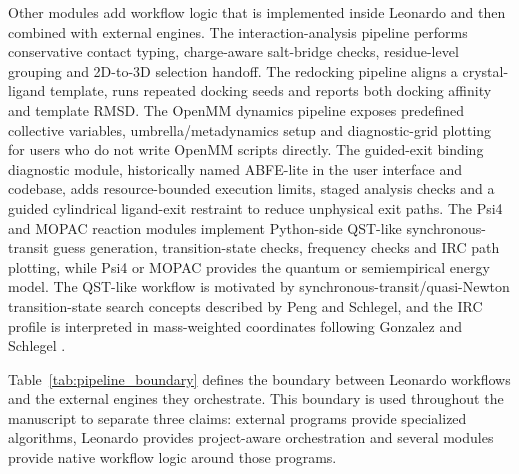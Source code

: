 \documentclass[pdflatex,sn-vancouver-num]{sn-jnl}
\begin{document}
Other modules add workflow logic that is implemented inside Leonardo and then combined with external engines.  The interaction-analysis pipeline performs conservative contact typing, charge-aware salt-bridge checks, residue-level grouping and 2D-to-3D selection handoff.  The redocking pipeline aligns a crystal-ligand template, runs repeated docking seeds and reports both docking affinity and template RMSD.  The OpenMM dynamics pipeline exposes predefined collective variables, umbrella/metadynamics setup and diagnostic-grid plotting for users who do not write OpenMM scripts directly.  The guided-exit binding diagnostic module, historically named ABFE-lite in the user interface and codebase, adds resource-bounded execution limits, staged analysis checks and a guided cylindrical ligand-exit restraint to reduce unphysical exit paths.  The Psi4 and MOPAC reaction modules implement Python-side QST-like synchronous-transit guess generation, transition-state checks, frequency checks and IRC path plotting, while Psi4 or MOPAC provides the quantum or semiempirical energy model.  The QST-like workflow is motivated by synchronous-transit/quasi-Newton transition-state search concepts described by Peng and Schlegel, and the IRC profile is interpreted in mass-weighted coordinates following Gonzalez and Schlegel \cite{peng_schlegel_qst1993,gonzalez_schlegel_irc1990}.

Table~\ref{tab:pipeline_boundary} defines the boundary between Leonardo workflows and the external engines they orchestrate.  This boundary is used throughout the manuscript to separate three claims: external programs provide specialized algorithms, Leonardo provides project-aware orchestration and several modules provide native workflow logic around those programs.
\end{document}
